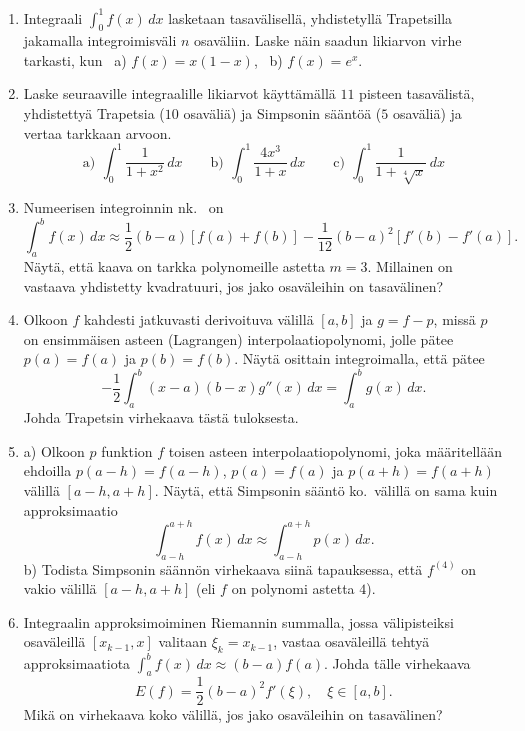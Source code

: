 \Harj
\begin{enumerate}

\item
Integraali $\int_0^1 f(x)\,dx$ lasketaan tasavälisellä, yhdistetyllä Trapetsilla jakamalla
integroimisväli $n$ osaväliin. Laske näin saadun likiarvon virhe tarkasti, kun \
a) $f(x)=x(1-x)$, \ b) $f(x)=e^x$.

\item
Laske seuraaville integraalille likiarvot käyttämällä $11$ pisteen tasavälistä, yhdistettyä
Trapetsia ($10$ osaväliä) ja Simpsonin sääntöä ($5$ osaväliä) ja vertaa tarkkaan arvoon.
\[
\text{a)}\,\ \int_0^1 \frac{1}{1+x^2}\,dx \qquad
\text{b)}\,\ \int_0^1 \frac{4x^3}{1+x}\,dx \qquad
\text{c)}\,\ \int_0^1 \frac{1}{1+\sqrt[4]{x}}\,dx
\]

\item \label{H-int-9: korjattu trapetsi} 
Numeerisen integroinnin nk.\ \kor{korjattu trapetsikaava} on
\[
\int_a^b f(x)\,dx \approx \frac{1}{2}(b-a)[f(a)+f(b)]-\frac{1}{12}(b-a)^2[f'(b)-f'(a)].
\]
Näytä, että kaava on tarkka polynomeille astetta $m=3$. Millainen on vastaava yhdistetty
kvadratuuri, jos jako osaväleihin on tasavälinen?

\item \label{H-int-9: Trapetsin virhekaava}
Olkoon $f$ kahdesti jatkuvasti derivoituva välillä $[a,b]$ ja $g=f-p$, missä $p$ on ensimmäisen
asteen (Lagrangen) interpolaatiopolynomi, jolle pätee $p(a)=f(a)$ ja $p(b)=f(b)$. Näytä
osittain integroimalla, että pätee
\[
-\frac{1}{2}\int_a^b (x-a)(b-x)g''(x)\,dx = \int_a^b g(x)\,dx.
\]
Johda Trapetsin virhekaava tästä tuloksesta.

\item \label{H-int-9: Simpson 1}
a) Olkoon $p$ funktion $f$ toisen asteen interpolaatiopolynomi, joka määritellään ehdoilla
$p(a-h)=f(a-h)$, $p(a)=f(a)$ ja $p(a+h)=f(a+h)$ välillä $[a-h,a+h]$. Näytä, että Simpsonin
sääntö ko.\ välillä on sama kuin approksimaatio
\[
\int_{a-h}^{a+h} f(x)\,dx \approx \int_{a-h}^{a+h} p(x)\,dx.
\]
b) Todista Simpsonin säännön virhekaava siinä tapauksessa, että $f^{(4)}$ on vakio 
välillä $[a-h,a+h]$ (eli $f$ on polynomi astetta $4$).

\item \label{H-int-9: Riemannin summa}
Integraalin approksimoiminen Riemannin summalla, jossa välipisteiksi osaväleillä $[x_{k-1},x]$
valitaan $\xi_k=x_{k-1}$, vastaa osaväleillä tehtyä approksimaatiota
$\int_a^b f(x)\,dx \approx (b-a)f(a)$. Johda tälle virhekaava
\[
E(f)=\frac{1}{2}(b-a)^2 f'(\xi), \quad \xi\in[a,b].
\]
Mikä on virhekaava koko välillä, jos jako osaväleihin on tasavälinen?


\end{enumerate}
